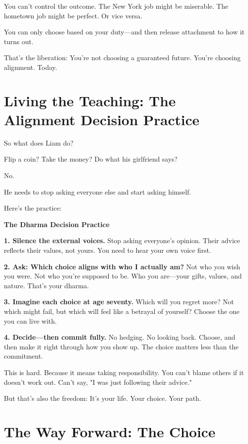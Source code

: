 \documentclass[11pt,twoside]{book}
\begin{document}
You can't control the outcome. The New York job might be miserable. The hometown job might be perfect. Or vice versa.

You can only choose based on your duty—and then release attachment to how it turns out.

That's the liberation: You're not choosing a guaranteed future. You're choosing alignment. Today.

\section*{Living the Teaching: The Alignment Decision Practice}

So what does Liam do?

Flip a coin? Take the money? Do what his girlfriend says?

No.

He needs to stop asking everyone else and start asking himself.

Here's the practice:

\begin{practicebox}
\textbf{The Dharma Decision Practice}

\textbf{1. Silence the external voices.}
Stop asking everyone's opinion. Their advice reflects their values, not yours. You need to hear your own voice first.

\textbf{2. Ask: Which choice aligns with who I actually am?}
Not who you wish you were. Not who you're supposed to be. Who you are—your gifts, values, and nature. That's your dharma.

\textbf{3. Imagine each choice at age seventy.}
Which will you regret more? Not which might fail, but which will feel like a betrayal of yourself? Choose the one you can live with.

\textbf{4. Decide—then commit fully.}
No hedging. No looking back. Choose, and then make it right through how you show up. The choice matters less than the commitment.
\end{practicebox}

This is hard. Because it means taking responsibility. You can't blame others if it doesn't work out. Can't say, "I was just following their advice."

But that's also the freedom: It's your life. Your choice. Your path.

\section*{The Way Forward: The Choice}
\end{document}
